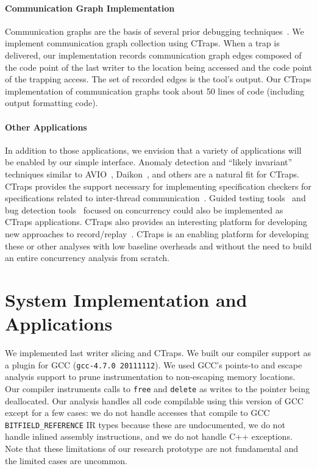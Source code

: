 \documentclass[preprint,9pt]{sigplanconf}
\newcommand{\ctraps}{CTraps\xspace}
\begin{document}
\paragraph{Communication Graph Implementation}
Communication graphs are the basis of several prior debugging
techniques~\cite{recon, bugaboo, defuse}.  We implement communication graph
collection using \ctraps.  When a trap is delivered, our implementation records
communication graph edges composed of the code point of the last writer to the
location being accessed and the code point of the trapping access.  The set of
recorded edges is the tool's output.  Our \ctraps implementation of
communication graphs took about 50 lines of code (including output formatting
code). 

\paragraph{Other Applications}
In addition to those applications, we envision that a variety of applications
will be enabled by our simple interface.  Anomaly detection and ``likely
invariant'' techniques similar to AVIO~\cite{avio}, Daikon~\cite{daikon}, and
others are a natural fit for \ctraps.  \ctraps provides the support necessary
for implementing specification checkers for specifications related to
inter-thread communication~\cite{velodrome,oshajava}.  Guided testing
tools~\cite{cuzz,chess} and bug detection tools~\cite{ctrigger} focused on
concurrency could also be implemented as \ctraps applications.  \ctraps also
provides an interesting platform for developing new approaches to
record/replay~\cite{chimera,fdr}.  \ctraps is an enabling platform for
developing these or other analyses with low baseline overheads and without the
need to build an entire concurrency analysis from scratch.

\section{System Implementation and Applications}

We implemented last writer slicing and \ctraps.  We built our compiler support
as a plugin for GCC ({\tt gcc-4.7.0 20111112}).  We used GCC's points-to and
escape analysis support to prune instrumentation to non-escaping memory
locations.  Our compiler instruments calls to {\tt free} and {\tt delete} as
writes to the pointer being deallocated.  Our analysis handles all code
compilable using this version of GCC except for a few cases: we do not handle
accesses that compile to GCC {\tt BITFIELD\_REFERENCE} IR types because these
are undocumented, we do not handle inlined assembly instructions, and we do not
handle C++ exceptions.  Note that these limitations of our research prototype
are not fundamental and the limited cases are uncommon.   
\end{document}
